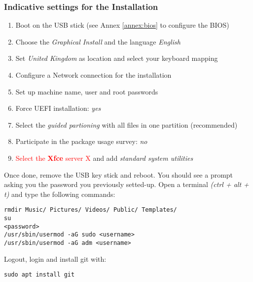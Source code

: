 \subsubsection{Indicative settings for the Installation}

\begin{enumerate}
	\item Boot on the USB stick (see Annex \ref{annex:bios} to configure the 
		BIOS)
	\item Choose the \textit{Graphical Install} and the language
		\textit{English}
	\item Set \textit{United Kingdom} as  location and select your keyboard mapping
	\item Configure a Network connection for the installation
	\item Set up  machine name, user and root passwords
	\item Force UEFI installation: \textit{yes} 
	\item Select the \textit{guided partioning} with all files in one partition (recommended)
	\item Participate in the package usage survey: \textit{no}
	\item \textcolor{red}{Select the \textbf{Xfce} server X} and add
		\textit{standard system utilities}
\end{enumerate}
\vspace{1pt}
\noindent Once done, remove the USB key stick and reboot. You should see a
prompt asking you the password you previously setted-up. 
Open a terminal \textit{(ctrl + alt + t)} and type the following commands:
\begin{lstlisting}
rmdir Music/ Pictures/ Videos/ Public/ Templates/
su
<password>
/usr/sbin/usermod -aG sudo <username>
/usr/sbin/usermod -aG adm <username>
\end{lstlisting}
Logout, login and install git with: 
\begin{lstlisting}
sudo apt install git
\end{lstlisting}
